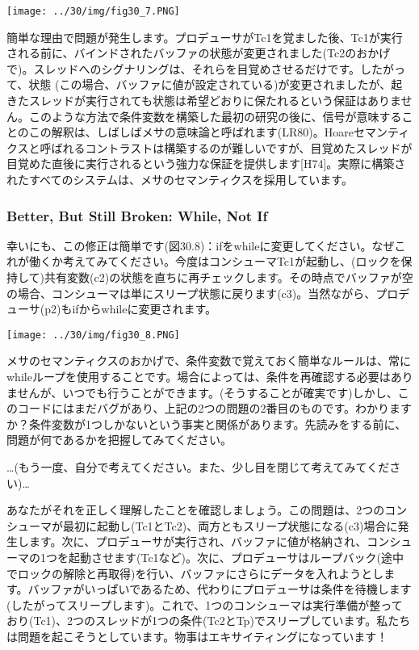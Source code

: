 \texttt{[image: ../30/img/fig30\_7.PNG]}

簡単な理由で問題が発生します。プロデューサがTc1を覚ました後、Tc1が実行される前に、バインドされたバッファの状態が変更されました(Tc2のおかげで)。スレッドへのシグナリングは、それらを目覚めさせるだけです。したがって、状態
(この場合、バッファに値が設定されている)が変更されましたが、起きたスレッドが実行されても状態は希望どおりに保たれるという保証はありません。このような方法で条件変数を構築した最初の研究の後に、信号が意味することのこの解釈は、しばしばメサの意味論と呼ばれます(LR80)。Hoareセマンティクスと呼ばれるコントラストは構築するのが難しいですが、目覚めたスレッドが目覚めた直後に実行されるという強力な保証を提供します{[}H74{]}。実際に構築されたすべてのシステムは、メサのセマンティクスを採用しています。

\hypertarget{better-but-still-broken-while-not-if}{%
\subsubsection*{Better, But Still Broken: While, Not
If}\label{better-but-still-broken-while-not-if}}

幸いにも、この修正は簡単です(図30.8)：ifをwhileに変更してください。なぜこれが働くか考えてみてください。今度はコンシューマTc1が起動し、(ロックを保持して)共有変数(c2)の状態を直ちに再チェックします。その時点でバッファが空の場合、コンシューマは単にスリープ状態に戻ります(c3)。当然ながら、プロデューサ(p2)もifからwhileに変更されます。

\texttt{[image: ../30/img/fig30\_8.PNG]}

メサのセマンティクスのおかげで、条件変数で覚えておく簡単なルールは、常にwhileループを使用することです。場合によっては、条件を再確認する必要はありませんが、いつでも行うことができます。(そうすることが確実です)しかし、このコードにはまだバグがあり、上記の2つの問題の2番目のものです。わかりますか？条件変数が1つしかないという事実と関係があります。先読みをする前に、問題が何であるかを把握してみてください。

\ldots(もう一度、自分で考えてください。また、少し目を閉じて考えてみてください)\ldots{}

あなたがそれを正しく理解したことを確認しましょう。この問題は、2つのコンシューマが最初に起動し(Tc1とTc2)、両方ともスリープ状態になる(c3)場合に発生します。次に、プロデューサが実行され、バッファに値が格納され、コンシューマの1つを起動させます(Tc1など)。次に、プロデューサはループバック(途中でロックの解除と再取得)を行い、バッファにさらにデータを入れようとします。バッファがいっぱいであるため、代わりにプロデューサは条件を待機します(したがってスリープします)。これで、1つのコンシューマは実行準備が整っており(Tc1)、2つのスレッドが1つの条件(Tc2とTp)でスリープしています。私たちは問題を起こそうとしています。物事はエキサイティングになっています！

